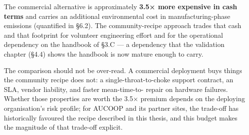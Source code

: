 The commercial alternative is approximately \textbf{3.5× more expensive
in cash terms} and carries an additional environmental cost in
manufacturing-phase emissions (quantified in §6.2). The community-recipe
approach trades that cash and that footprint for volunteer engineering
effort and for the operational dependency on the handbook of §3.C --- a
dependency that the validation chapter (§4.4) shows the handbook is now
mature enough to carry.

The comparison should not be over-read. A commercial deployment buys
things the community recipe does not: a single-throat-to-choke support
contract, an SLA, vendor liability, and faster mean-time-to- repair on
hardware failures. Whether those properties are worth the 3.5× premium
depends on the deploying organisation's risk profile; for AUCOOP and its
partner sites, the trade-off has historically favoured the recipe
described in this thesis, and this budget makes the magnitude of that
trade-off explicit.
